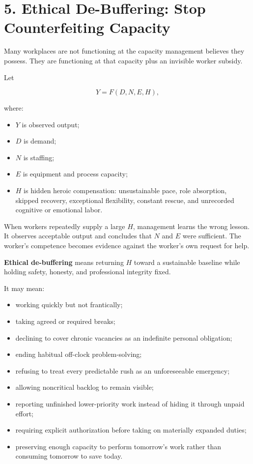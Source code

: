 \documentclass[11pt,oneside]{article}
\providecommand{\tightlist}{%
  \setlength{\itemsep}{0.22em}\setlength{\parskip}{0pt}}
\begin{document}
\section{5. Ethical De-Buffering: Stop Counterfeiting
Capacity}\label{ethical-de-buffering-stop-counterfeiting-capacity}

Many workplaces are not functioning at the capacity management believes
they possess. They are functioning at that capacity plus an invisible
worker subsidy.

Let

\[
Y = F(D,N,E,H),
\]

where:

\begin{itemize}
\tightlist
\item
  \(Y\) is observed output;
\item
  \(D\) is demand;
\item
  \(N\) is staffing;
\item
  \(E\) is equipment and process capacity;
\item
  \(H\) is hidden heroic compensation: unsustainable pace, role
  absorption, skipped recovery, exceptional flexibility, constant
  rescue, and unrecorded cognitive or emotional labor.
\end{itemize}

When workers repeatedly supply a large \(H\), management learns the
wrong lesson. It observes acceptable output and concludes that \(N\) and
\(E\) were sufficient. The worker's competence becomes evidence against
the worker's own request for help.

\textbf{Ethical de-buffering} means returning \(H\) toward a sustainable
baseline while holding safety, honesty, and professional integrity
fixed.

It may mean:

\begin{itemize}
\tightlist
\item
  working quickly but not frantically;
\item
  taking agreed or required breaks;
\item
  declining to cover chronic vacancies as an indefinite personal
  obligation;
\item
  ending habitual off-clock problem-solving;
\item
  refusing to treat every predictable rush as an unforeseeable
  emergency;
\item
  allowing noncritical backlog to remain visible;
\item
  reporting unfinished lower-priority work instead of hiding it through
  unpaid effort;
\item
  requiring explicit authorization before taking on materially expanded
  duties;
\item
  preserving enough capacity to perform tomorrow's work rather than
  consuming tomorrow to save today.
\end{itemize}
\end{document}
